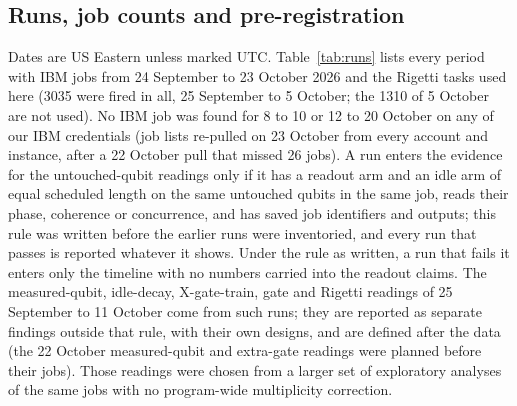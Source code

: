 \documentclass[reprint,amsmath,amssymb,aps,superscriptaddress,nofootinbib]{revtex4-2}
\begin{document}
\subsection{Runs, job counts and pre-registration}

Dates are US Eastern unless marked UTC. Table~\ref{tab:runs} lists every period with IBM jobs from 24 September to 23 October 2026 and the Rigetti tasks used here (3035 were fired in all, 25 September to 5 October; the 1310 of 5 October are not used). No IBM job was found for 8 to 10 or 12 to 20 October on any of our IBM credentials (job lists re-pulled on 23 October from every account and instance, after a 22 October pull that missed 26 jobs). A run enters the evidence for the untouched-qubit readings only if it has a readout arm and an idle arm of equal scheduled length on the same untouched qubits in the same job, reads their phase, coherence or concurrence, and has saved job identifiers and outputs; this rule was written before the earlier runs were inventoried, and every run that passes is reported whatever it shows. Under the rule as written, a run that fails it enters only the timeline with no numbers carried into the readout claims. The measured-qubit, idle-decay, X-gate-train, gate and Rigetti readings of 25 September to 11 October come from such runs; they are reported as separate findings outside that rule, with their own designs, and are defined after the data (the 22 October measured-qubit and extra-gate readings were planned before their jobs). Those readings were chosen from a larger set of exploratory analyses of the same jobs with no program-wide multiplicity correction.
\end{document}
